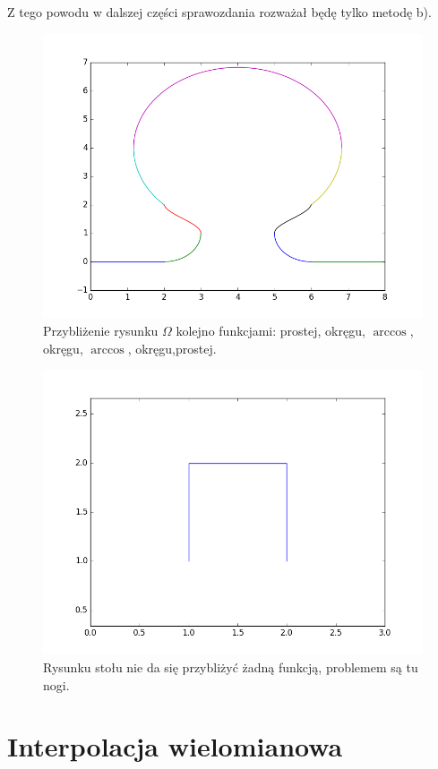 \documentclass{article}
\begin{document}
Z tego powodu w dalszej części sprawozdania rozważał będę tylko metodę b).

\begin{figure}[H]
    \centering
	\includegraphics[width= 0.7 \textwidth]{omega.png}
    \caption{Przybliżenie rysunku $\Omega$ kolejno funkcjami: prostej, okręgu, $\arccos$, okręgu, $\arccos$, okręgu,prostej. }
 	\label{omega}
\end{figure}
\begin{figure}[H]
    \centering
	\includegraphics[width= 0.5 \textwidth]{stol.png}
    \caption{Rysunku stołu nie da się przybliżyć żadną funkcją, problemem są tu nogi.}
 	\label{stol}
\end{figure}

\section{Interpolacja wielomianowa}
\end{document}
